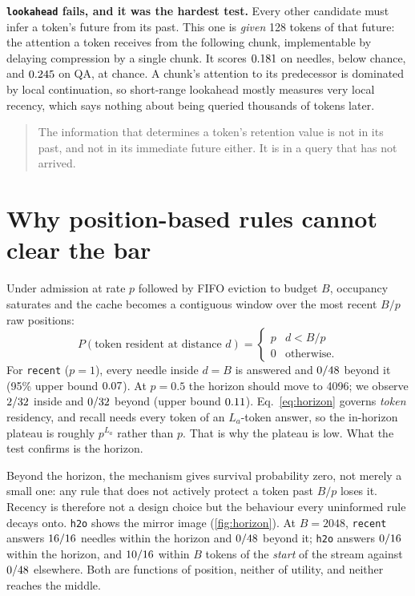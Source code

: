 \documentclass[10pt]{article}
\begin{document}
\textbf{\texttt{lookahead} fails, and it was the hardest test.} Every other
candidate must infer a token's future from its past. This one is \emph{given}
128 tokens of that future: the attention a token receives from the following
chunk, implementable by delaying compression by a single chunk. It scores
$0.181$ on needles, below chance, and $0.245$ on QA, at
chance. A chunk's attention to its predecessor
is dominated by local continuation, so short-range lookahead mostly measures
very local recency, which says nothing about being queried thousands of tokens
later.

\begin{quote}
The information that determines a token's retention value is not in its past,
and not in its immediate future either. It is in a query that has not arrived.
\end{quote}

\section{Why position-based rules cannot clear the bar}\label{sec:mech}



Under admission at rate $p$ followed by FIFO eviction to budget $B$, occupancy
saturates and the cache becomes a contiguous window over the most recent $B/p$
raw positions:
\begin{equation}
  P(\text{token resident at distance } d) =
  \begin{cases} p & d < B/p \\ 0 & \text{otherwise.}\end{cases}
  \label{eq:horizon}
\end{equation}
For \texttt{recent} ($p{=}1$), every needle inside $d{=}B$ is answered and
$0/48$ beyond it (95\% upper bound $0.07$). At
$p{=}0.5$ the horizon should move to 4096; we observe $2/32$ inside
and $0/32$ beyond (upper bound $0.11$).
Eq.~\eqref{eq:horizon} governs \emph{token} residency, and recall needs every
token of an $L_a$-token answer, so the in-horizon plateau is roughly
$p^{L_a}$ rather than $p$. That is why the plateau is low. What the test
confirms is the horizon.

Beyond the horizon, the mechanism gives survival probability zero, not merely
a small one: any rule that does not actively protect a token past $B/p$ loses
it. Recency is therefore not a design choice but the behaviour every
uninformed rule decays onto. \texttt{h2o} shows the mirror image
(\cref{fig:horizon}). At $B{=}2048$, \texttt{recent} answers
$16/16$ needles within the horizon and $0/48$ beyond it;
\texttt{h2o} answers $0/16$ within the horizon, and
$10/16$ within $B$ tokens of the \emph{start} of the stream
against $0/48$ elsewhere. Both are functions of position, neither
of utility, and neither reaches the middle.
\end{document}
